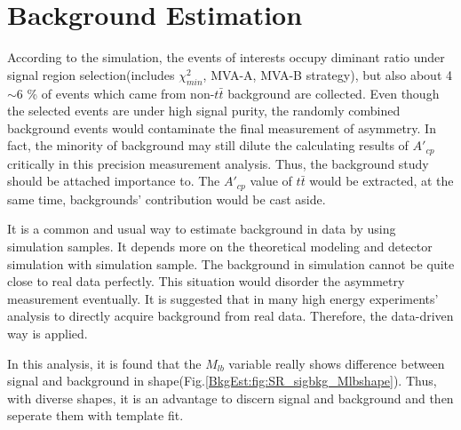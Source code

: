 

\section{Background Estimation}
\label{sec:BkgEst}

	According to the simulation, the events of interests occupy diminant ratio under signal region selection(includes $\chi^2_{min}$, MVA-A, MVA-B strategy), but also about 4$\sim$6 \% of events which came from non-$t\bar{t}$ background are collected. Even though the selected events are under high signal purity, the randomly combined background events would contaminate the final measurement of asymmetry. In fact, the minority of background may still dilute the calculating results of $A'_{cp}$ critically in this precision measurement analysis. Thus, the background study should be attached importance to. The $A'_{cp}$ value of $t\bar{t}$ would be extracted, at the same time, backgrounds' contribution would be cast aside.

	It is a common and usual way to estimate background in data by using simulation samples. It depends more on the theoretical modeling and detector simulation with simulation sample. The background in simulation cannot be quite close to real data perfectly. This situation would disorder the asymmetry measurement eventually. It is suggested that in many high energy experiments' analysis to directly acquire background from real data. Therefore, the data-driven way is applied.
	
	In this analysis, it is found that the $M_{lb}$ variable really shows difference between signal and background in shape(Fig.\ref{BkgEst:fig:SR_sigbkg_Mlbshape}). Thus, with diverse shapes, it is an advantage to discern signal and background and then seperate them with template fit.

